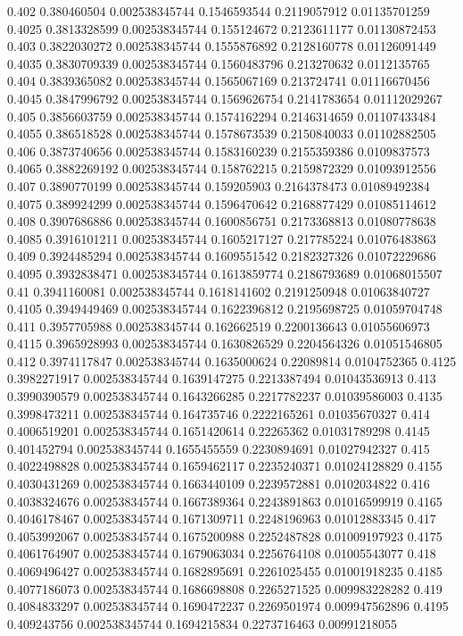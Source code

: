 {0.402 0.380460504 0.002538345744 0.1546593544 0.2119057912 0.01135701259
0.4025 0.3813328599 0.002538345744 0.155124672 0.2123611177 0.01130872453
0.403 0.3822030272 0.002538345744 0.1555876892 0.2128160778 0.01126091449
0.4035 0.3830709339 0.002538345744 0.1560483796 0.213270632 0.0112135765
0.404 0.3839365082 0.002538345744 0.1565067169 0.213724741 0.01116670456
0.4045 0.3847996792 0.002538345744 0.1569626754 0.2141783654 0.01112029267
0.405 0.3856603759 0.002538345744 0.1574162294 0.2146314659 0.01107433484
0.4055 0.386518528 0.002538345744 0.1578673539 0.2150840033 0.01102882505
0.406 0.3873740656 0.002538345744 0.1583160239 0.2155359386 0.0109837573
0.4065 0.3882269192 0.002538345744 0.158762215 0.2159872329 0.01093912556
0.407 0.3890770199 0.002538345744 0.159205903 0.2164378473 0.01089492384
0.4075 0.389924299 0.002538345744 0.1596470642 0.2168877429 0.01085114612
0.408 0.3907686886 0.002538345744 0.1600856751 0.2173368813 0.01080778638
0.4085 0.3916101211 0.002538345744 0.1605217127 0.217785224 0.01076483863
0.409 0.3924485294 0.002538345744 0.1609551542 0.2182327326 0.01072229686
0.4095 0.3932838471 0.002538345744 0.1613859774 0.2186793689 0.01068015507
0.41 0.3941160081 0.002538345744 0.1618141602 0.2191250948 0.01063840727
0.4105 0.3949449469 0.002538345744 0.1622396812 0.2195698725 0.01059704748
0.411 0.3957705988 0.002538345744 0.162662519 0.2200136643 0.01055606973
0.4115 0.3965928993 0.002538345744 0.1630826529 0.2204564326 0.01051546805
0.412 0.3974117847 0.002538345744 0.1635000624 0.22089814 0.0104752365
0.4125 0.3982271917 0.002538345744 0.1639147275 0.2213387494 0.01043536913
0.413 0.3990390579 0.002538345744 0.1643266285 0.2217782237 0.01039586003
0.4135 0.3998473211 0.002538345744 0.164735746 0.2222165261 0.01035670327
0.414 0.4006519201 0.002538345744 0.1651420614 0.22265362 0.01031789298
0.4145 0.401452794 0.002538345744 0.1655455559 0.2230894691 0.01027942327
0.415 0.4022498828 0.002538345744 0.1659462117 0.2235240371 0.01024128829
0.4155 0.4030431269 0.002538345744 0.1663440109 0.2239572881 0.0102034822
0.416 0.4038324676 0.002538345744 0.1667389364 0.2243891863 0.01016599919
0.4165 0.4046178467 0.002538345744 0.1671309711 0.2248196963 0.01012883345
0.417 0.4053992067 0.002538345744 0.1675200988 0.2252487828 0.01009197923
0.4175 0.4061764907 0.002538345744 0.1679063034 0.2256764108 0.01005543077
0.418 0.4069496427 0.002538345744 0.1682895691 0.2261025455 0.01001918235
0.4185 0.4077186073 0.002538345744 0.1686698808 0.2265271525 0.009983228282
0.419 0.4084833297 0.002538345744 0.1690472237 0.2269501974 0.009947562896
0.4195 0.409243756 0.002538345744 0.1694215834 0.2273716463 0.00991218055
}
